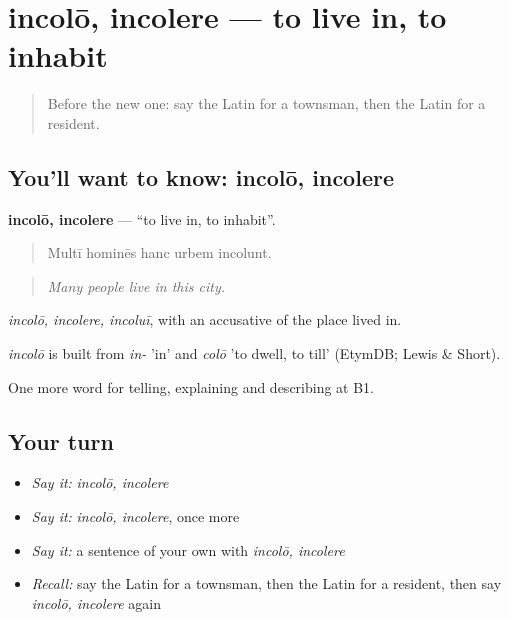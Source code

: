 \section[incolō, incolere]{incolō, incolere — to live in, to inhabit}

\label{lesson:LA-C456-incolo}



\begin{quote}
Before the new one: say the Latin for a townsman, then the Latin for a resident.
\end{quote}

\subsection*{You'll want to know: incolō, incolere}
\textbf{incolō, incolere} — \textquotedblleft{}to live in, to inhabit\textquotedblright{}.

\begin{quote}
Multī hominēs hanc urbem incolunt.
\end{quote}

\begin{quote}
\emph{Many people live in this city.}
\end{quote}

\emph{incolō, incolere, incoluī}, with an accusative of the place lived in.

\begin{cousinweb}
\emph{incolō} is built from \emph{in-} 'in' and \emph{colō} 'to dwell, to till' (EtymDB; Lewis \& Short).
\end{cousinweb}

\begin{grammarlens}[title={What you've built}]
One more word for telling, explaining and describing at B1.
\end{grammarlens}

\subsection*{Your turn}
\begin{itemize}
\raggedright
  \item \emph{Say it:} \emph{incolō, incolere}
  \item \emph{Say it:} \emph{incolō, incolere}, once more
  \item \emph{Say it:} a sentence of your own with \emph{incolō, incolere}
  \item \emph{Recall:} say the Latin for a townsman, then the Latin for a resident, then say \emph{incolō, incolere} again
\end{itemize}

